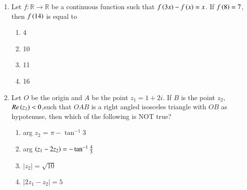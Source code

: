 \documentclass[journal]{IEEEtran}
\begin{document}
\begin{enumerate}
    \item Let $f: \mathbb{R} \rightarrow \mathbb{R}$ be a continuous function such that $f\left(3x\right) - f\left(x\right) = x$. If $f\left(8\right) = 7$, then $f\left(14\right)$ is equal to
    \begin{multicols}{2}
    \begin{enumerate}
        \item 4
        \item 10
        \item 11
        \item 16
    \end{enumerate}
     \end{multicols} 
     \item Let $O$ be the origin and $A$ be the point $z_1 = 1 + 2 i$. If $B$ is the point $z_2$, $Re\left(z_2\right) < 0$,such that $OAB$ is a right angled isosceles triangle with $OB$ as hypotenuse, then which of the following is NOT true?
     \begin{multicols}{2}
     \begin{enumerate}
         \item arg $z_2$ = $\pi - \tan^{-1}{3}$
         \item arg $\left(z_1 - 2 z_2\right) = -\tan^{-1}\frac{4}{3}$
         \item $|z_2 | = \sqrt{10}$
         \item $|2z_1 - z_2| = 5$
     \end{enumerate}
         

\end{multicols}
\end{enumerate}
\end{document}
